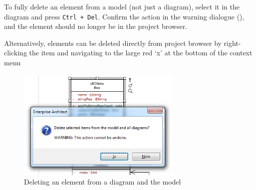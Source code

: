 \begin{stepbystep}
\item To fully delete an element from a model (not just a diagram), select it in the diagram and press \texttt{Ctrl + Del}. Confirm the
action in the warning dialogue (), and the element should no longer be in the project browser.

\vspace{0.5cm}

\item Alternatively, elements can be deleted directly from project browser by right-clicking the item and navigating to the large
red `x' at the bottom of the context menu

\begin{figure}[htbp]
\begin{center}
  \includegraphics[width=0.7\textwidth]{ea_deleteWarning}
  \caption{Deleting an element from a diagram and the model}  
  \label{ea:deleteWarning}
\end{center}
\end{figure}  

\end{stepbystep}
